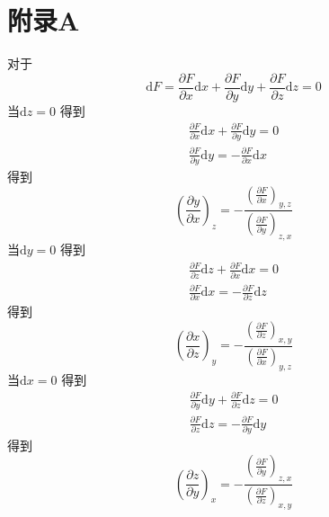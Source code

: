 \section{附录A}



对于
\begin{equation}
    \mathrm{d}F=\frac{\partial F}{\partial x}\mathrm{d}x+\frac{\partial F}{\partial y}\mathrm{d}y+\frac{\partial F}{\partial z}\mathrm{d}z=0
\end{equation}
当$\mathrm{d}z=0$
得到
\begin{equation}
    \begin{aligned}
        \frac{\partial F}{\partial x}\mathrm{d}x+\frac{\partial F}{\partial y}\mathrm{d}y=0
\\
\frac{\partial F}{\partial y}\mathrm{d}y=-\frac{\partial F}{\partial x}\mathrm{d}x
    \end{aligned}
\end{equation}
得到
\begin{equation}
    \left( \frac{\partial y}{\partial x} \right) _z=-\frac{\left( \frac{\partial F}{\partial x} \right) _{y,z}}{\left( \frac{\partial F}{\partial y} \right) _{z,x}}
\end{equation}
当$\mathrm{d}y=0$
得到
\begin{equation}
    \begin{aligned}
        \frac{\partial F}{\partial z}\mathrm{d}z+\frac{\partial F}{\partial x}\mathrm{d}x=0
\\
\frac{\partial F}{\partial x}\mathrm{d}x=-\frac{\partial F}{\partial z}\mathrm{d}z
    \end{aligned}
\end{equation}
得到
\begin{equation}
    \left( \frac{\partial x}{\partial z} \right) _y=-\frac{\left( \frac{\partial F}{\partial z} \right) _{x,y}}{\left( \frac{\partial F}{\partial x} \right) _{y,z}}
\end{equation}
当$\mathrm{d}x=0$
得到
\begin{equation}
    \begin{aligned}
        \frac{\partial F}{\partial y}\mathrm{d}y+\frac{\partial F}{\partial z}\mathrm{d}z=0
\\
\frac{\partial F}{\partial z}\mathrm{d}z=-\frac{\partial F}{\partial y}\mathrm{d}y
    \end{aligned}
\end{equation}
得到
\begin{equation}
    \left( \frac{\partial z}{\partial y} \right) _x=-\frac{\left( \frac{\partial F}{\partial y} \right) _{z,x}}{\left( \frac{\partial F}{\partial z} \right) _{x,y}}
\end{equation}
